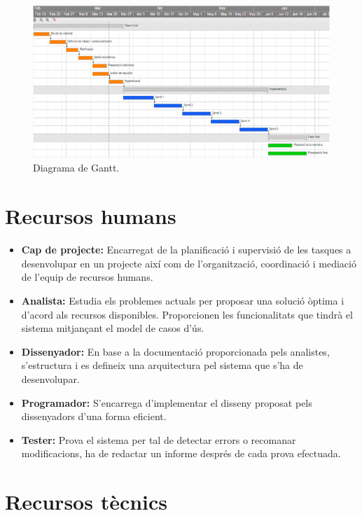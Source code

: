 \begin{figure}[!h]
\centering
\includegraphics[scale=0.65]{Figures/Gantt.jpg}
\caption{Diagrama de Gantt.}
\end{figure}

\section{Recursos humans}

\begin{itemize}

\item{}\textbf{Cap de projecte:} Encarregat de la planificació i supervisió de les tasques a desenvolupar en un projecte així com de l’organització, coordinació i mediació de l’equip de recursos humans.
\item{}\textbf{Analista:} Estudia els problemes actuals per proposar una solució òptima i d’acord als recursos disponibles. Proporcionen les funcionalitats que tindrà el sistema mitjançant el model de casos d’ús.
\item{}\textbf{Dissenyador:} En base a la documentació proporcionada pels analistes, s’estructura i es defineix una arquitectura pel sistema que s’ha de desenvolupar. 
\item{}\textbf{Programador:} S’encarrega d’implementar el disseny proposat pels dissenyadors d’una forma eficient.
\item{}\textbf{Tester:} Prova el sistema per tal de detectar errors o recomanar modificacions, ha de redactar un informe després de cada prova efectuada.
\end{itemize}

\clearpage

\section{Recursos tècnics}

